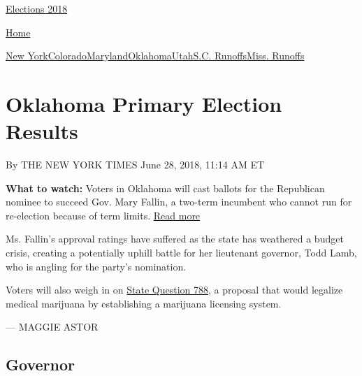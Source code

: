 \href{//www.nytimes3xbfgragh.onion}{}\href{https://www.nytimes3xbfgragh.onion/interactive/2018/us/elections/calendar-primary-results.html}{
Elections 2018}

\href{//www.nytimes3xbfgragh.onion}{ Home}

\href{https://www.nytimes3xbfgragh.onion/interactive/2018/06/26/us/elections/results-new-york-primary-elections.html}{New
York}\href{https://www.nytimes3xbfgragh.onion/interactive/2018/06/26/us/elections/results-colorado-primary-elections.html}{Colorado}\href{https://www.nytimes3xbfgragh.onion/interactive/2018/06/26/us/elections/results-maryland-primary-elections.html}{Maryland}\href{https://www.nytimes3xbfgragh.onion/interactive/2018/06/26/us/elections/results-oklahoma-primary-elections.html}{Oklahoma}\href{https://www.nytimes3xbfgragh.onion/interactive/2018/06/26/us/elections/results-utah-primary-elections-ul.html}{Utah}\href{https://www.nytimes3xbfgragh.onion/interactive/2018/06/26/us/elections/results-south-carolina-primary-runoff-elections.html}{S.C.
Runoffs}\href{https://www.nytimes3xbfgragh.onion/interactive/2018/06/26/us/elections/results-mississippi-primary-runoff-elections.html}{Miss.
Runoffs}

\hypertarget{oklahoma-primary-election-results}{%
\section{Oklahoma Primary Election
Results}\label{oklahoma-primary-election-results}}

By THE NEW YORK TIMES June 28, 2018, 11:14 AM ET

\textbf{What to watch:} Voters in Oklahoma will cast ballots for the
Republican nominee to succeed Gov. Mary Fallin, a two-term incumbent who
cannot run for re-election because of term limits.
\protect\hyperlink{}{Read more}

Ms. Fallin's approval ratings have suffered as the state has weathered a
budget crisis, creating a potentially uphill battle for her lieutenant
governor, Todd Lamb, who is angling for the party's nomination.

Voters will also weigh in on
\href{https://www.sos.ok.gov/documents/questions/788.pdf}{State Question
788}, a proposal that would legalize medical marijuana by establishing a
marijuana licensing system.

--- MAGGIE ASTOR

\hypertarget{governor}{%
\subsection{Governor}\label{governor}}

